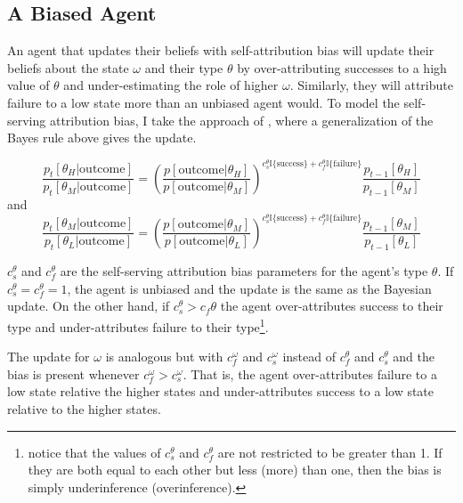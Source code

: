 \documentclass[
  12pt,
]{article}
\begin{document}
\hypertarget{a-biased-agent}{%
\subsection{A Biased Agent}\label{a-biased-agent}}

An agent that updates their beliefs with self-attribution bias will
update their beliefs about the state \(\omega\) and their type
\(\theta\) by over-attributing successes to a high value of \(\theta\)
and under-estimating the role of higher \(\omega\). Similarly, they will
attribute failure to a low state more than an unbiased agent would. To
model the self-serving attribution bias, I take the approach of
\citet{benjamin2019}, where a generalization of the Bayes rule above
gives the update.

\begin{equation}
\frac{p_{t}[\theta_H|\text{outcome}]}{p_{t}[\theta_M|\text{outcome}]} = 
      \left(\frac{p[\text{outcome}|\theta_H]}{p[\text{outcome}|\theta_M]}\right)^{c_s^{\theta}\mathbb{I}\{\text{success}\}+c_f^{\theta}\mathbb{I}\{\text{failure}\}}\frac{p_{t-1}[\theta_H]}{p_{t-1}[\theta_M]}
\end{equation} and \begin{equation}
\frac{p_{t}[\theta_M|\text{outcome}]}{p_{t}[\theta_L|\text{outcome}]} = 
      \left(\frac{p[\text{outcome}|\theta_M]}{p[\text{outcome}|\theta_L]}\right)^{c_s^{\theta}\mathbb{I}\{\text{success}\}+c_f^{\theta}\mathbb{I}\{\text{failure}\}}\frac{p_{t-1}[\theta_M]}{p_{t-1}[\theta_L]}
\end{equation}

\(c_s^{\theta}\) and \(c_f^{\theta}\) are the self-serving attribution
bias parameters for the agent's type \(\theta\). If
\(c_s^{\theta} = c_f^{\theta} = 1\), the agent is unbiased and the
update is the same as the Bayesian update. On the other hand, if
\(c_s^{\theta} > c_f{\theta}\) the agent over-attributes success to
their type and under-attributes failure to their type\footnote{
  notice that the values of $c_s^{\theta}$ and $c_f^{\theta}$ are not restricted to be greater than 1. If they are both equal to 
  each other but less (more) than one, then the bias is simply underinference (overinference).}.

The update for \(\omega\) is analogous but with \(c_f^{\omega}\) and
\(c_s^{\omega}\) instead of \(c_f^{\theta}\) and \(c_s^{\theta}\) and
the bias is present whenever \(c_f^{\omega} > c_s^{\omega}\). That is,
the agent over-attributes failure to a low state relative the higher
states and under-attributes success to a low state relative to the
higher states.
\end{document}
